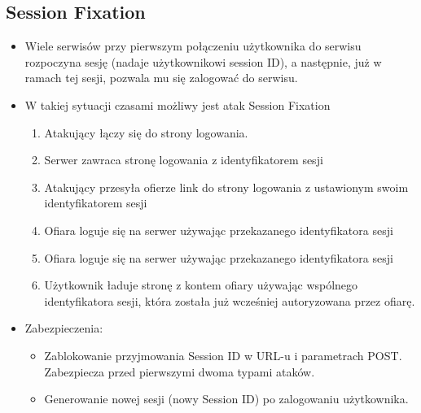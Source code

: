 \documentclass[../main.tex]{subfiles}
\begin{document}
    \subsection{Session Fixation}
    \begin{itemize}
        \item Wiele serwisów przy pierwszym połączeniu użytkownika do serwisu
        rozpoczyna sesję (nadaje użytkownikowi session ID), a następnie, już w
        ramach tej sesji, pozwala mu się zalogować do serwisu.
        \item W takiej sytuacji czasami możliwy jest atak Session Fixation
        \begin{enumerate}
            \item Atakujący łączy się do strony logowania.
            \item Serwer zawraca stronę logowania z identyfikatorem sesji
            \item Atakujący przesyła ofierze link do strony logowania z ustawionym swoim identyfikatorem sesji
            \item Ofiara loguje się na serwer używając przekazanego identyfikatora sesji
            \item Ofiara loguje się na serwer używając przekazanego identyfikatora sesji
            \item Użytkownik ładuje stronę z kontem ofiary używając wspólnego identyfikatora
            sesji, która została już wcześniej autoryzowana przez ofiarę.
        \end{enumerate}
        \item Zabezpieczenia:
        \begin{itemize}
            \item Zablokowanie przyjmowania Session ID w URL-u i parametrach POST.
            Zabezpiecza przed pierwszymi dwoma typami ataków.
            \item Generowanie nowej sesji (nowy Session ID) po zalogowaniu użytkownika.
        \end{itemize}
    \end{itemize}
\end{document}
